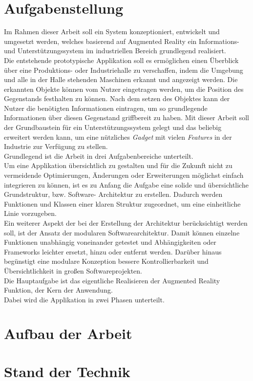 \section{Aufgabenstellung}
\label{chap:Aufgabenstellung}
Im Rahmen dieser Arbeit soll ein System konzeptioniert, entwickelt und umgesetzt werden, welches basierend auf Augmented Reality ein 
Informations- und Unterstützungssystem im industriellen Bereich grundlegend realisiert. 
\\Die entstehende prototypische Applikation soll es ermöglichen einen Überblick über eine Produktions- oder Industriehalle zu 
verschaffen, indem die Umgebung und alle in der Halle stehenden Maschinen erkannt und angezeigt werden. Die erkannten Objekte können 
vom Nutzer eingetragen werden, um die Position des Gegenstands festhalten zu können. Nach dem setzen des Objektes kann der Nutzer 
die benötigten Informationen eintragen, um so grundlegende Informationen über diesen Gegenstand griffbereit zu haben. Mit dieser Arbeit 
soll der Grundbaustein für ein Unterstützungssystem gelegt und das beliebig erweitert werden kann, um eine nützliches \textit{Gadget} 
mit vielen \textit{Features} in der Industrie zur Verfügung zu stellen.
\\ 
\linebreak
Grundlegend ist die Arbeit in drei Aufgabenbereiche unterteilt.
\\
\linebreak
Um eine Applikation übersichtlich zu gestalten und für die Zukunft nicht zu vermeidende Optimierungen, Änderungen oder Erweiterungen 
möglichst einfach integrieren zu können, ist es zu Anfang die Aufgabe eine solide und übersichtliche Grundstruktur, bzw. Software-
Architektur zu erstellen. Dadurch werden Funktionen und Klassen einer klaren Struktur zugeordnet, um eine einheitliche Linie vorzugeben. 
\\
Ein weiterer Aspekt der bei der Erstellung der Architektur berücksichtigt werden soll, ist der Ansatz der modularen 
Softwarearchitektur. Damit können einzelne Funktionen unabhängig voneinander getestet und Abhängigkeiten oder Frameworks leichter 
ersetzt, hinzu oder entfernt werden. Darüber hinaus begünstigt eine modulare Konzeption bessere Kontrollierbarkeit und Übersichtlichkeit 
in großen Softwareprojekten.
\\
\linebreak
Die Hauptaufgabe ist das eigentliche Realisieren der Augmented Reality Funktion, der Kern der Anwendung.
\\ 
Dabei wird die Applikation in zwei Phasen unterteilt.


\section{Aufbau der Arbeit}
\label{chap:Aufbau der Arbeit}

\section{Stand der Technik}
\label{chap:Stand der Technik}